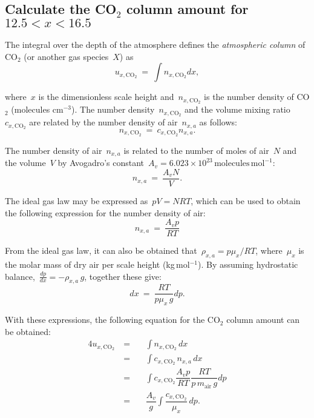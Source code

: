 \subsection{Calculate the CO$_2$ column amount for $12.5 < x < 16.5$}

   The integral over the depth of the atmosphere defines the \emph{atmospheric column} of CO$_2$ (or another gas species~$X$) as
   \begin{equation}
   u_{x, \text{CO}_2}\ =\ \int n_{x, \text{CO}_2} dx, \nonumber
   \end{equation}

   \noindent where~$x$ is the dimensionless scale height and~$n_{x, \text{CO}_2}$ is the number density of CO$_2$ (molecules cm$^{-3}$). The number density~$n_{x, \text{CO}_2}$ and the volume mixing ratio~$c_{x, \text{CO}_2}$ are related by the number density of air~$n_{x, a}$ as follows:
   \begin{equation}
   n_{x, \text{CO}_2}\ =\ c_{x, \text{CO}_2} n_{x,a}. \nonumber
   \end{equation}

   \noindent The number density of air~$n_{x,a}$ is related to the number of moles of air~$N$ and the volume~$V$ by Avogadro's constant~${A_v = 6.023 \times 10^{23}\, \text{molecules}\, \text{mol}^{-1}}$:
   \begin{equation}
   n_{x,a}\ =\ \dfrac{A_v N}{V}.\nonumber
   \end{equation}

   \noindent The ideal gas law may be expressed as~${pV = NRT}$, which can be used to obtain the following expression for the number density of air:
   \begin{equation}
   n_{x,a}\ =\ \dfrac{A_v p}{RT}\nonumber
   \end{equation}

   \noindent From the ideal gas law, it can also be obtained that~${\rho_{x,a} = p\mu_x / RT}$, where~$\mu_x$ is the molar mass of dry air per scale height (kg$\,$mol$^{-1}$). By assuming hydrostatic balance,~${\frac{dp}{dx} = - \rho_{x,a}\, g}$, together these give:
   \begin{equation}
   dx\ =\ \dfrac{RT}{p \mu_x\, g} dp. \nonumber
   \end{equation}

   With these expressions, the following equation for the CO$_2$ column amount can be obtained:
   \begin{alignat}{4}
   u_{x, \text{CO}_2}\ & =\ && \int n_{x, \text{CO}_2}\, dx \nonumber \\
                       & =\ && \int c_{x, \text{CO}_2}\, n_{x,a}\, dx \nonumber \\
                       & =\ && \int c_{x, \text{CO}_2} \dfrac{A_v p}{RT} \dfrac{RT}{p\, m_{\text{air}}\,g} dp \nonumber \\
                       & =\ && \dfrac{A_v}{g} \int \dfrac{c_{x, \text{CO}_2}}{\mu_x}\, dp. \nonumber
   \end{alignat}

